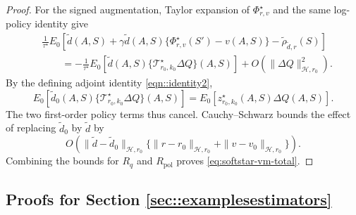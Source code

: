 \documentclass[11pt]{article}
\theoremstyle{plain}
\begin{document}
\begin{proof}
For the signed augmentation, Taylor expansion of
\(\Phi_{r,v}^\star\) and the same log-policy identity give
\begin{align*}
&\frac{1}{\tau^\star}E_0\!\left[
\widetilde d(A,S)
+\gamma\widetilde d(A,S)\{\Phi_{r,v}^\star(S')-v(A,S)\}
-\widetilde\rho_{\widetilde d,r}(S)\right]\\
&\qquad=
-\frac{1}{\tau^\star}
E_0\!\left[\widetilde d(A,S)
\{\mathcal T_{r_0,k_0}^\star\Delta Q\}(A,S)\right]
+O(\|\Delta Q\|_{\mathcal H,r_0}^2).
\end{align*}
By the defining adjoint identity \eqref{eqn::identity2},
\[
E_0[\widetilde d_0(A,S)
\{\mathcal T_{r_0,k_0}^\star\Delta Q\}(A,S)]
=
E_0[z_{r_0,k_0}^\star(A,S)\Delta Q(A,S)].
\]
The two first-order policy terms thus cancel. Cauchy--Schwarz bounds the
effect of replacing \(\widetilde d_0\) by \(\widetilde d\) by
\[
O\!\left(
\|\widetilde d-\widetilde d_0\|_{\mathcal H,r_0}
\{\|r-r_0\|_{\mathcal H,r_0}+\|v-v_0\|_{\mathcal H,r_0}\}
\right).
\]
Combining the bounds for \(R_q\) and \(R_{\mathrm{pol}}\) proves
\eqref{eq:softstar-vm-total}.
\end{proof}



\subsection{Proofs for Section \ref{sec::examplesestimators}}
\end{document}
